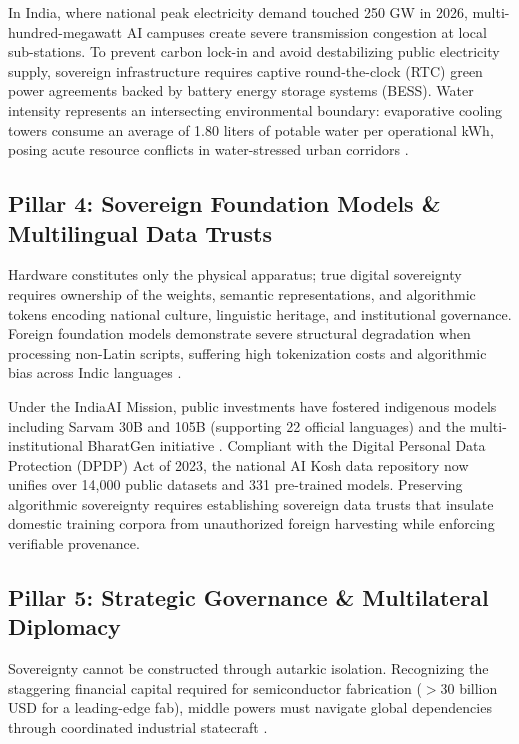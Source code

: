 \documentclass[conference,a4paper]{IEEEtran}
\begin{document}
In India, where national peak electricity demand touched 250 GW in 2026, multi-hundred-megawatt AI campuses create severe transmission congestion at local sub-stations. To prevent carbon lock-in and avoid destabilizing public electricity supply, sovereign infrastructure requires captive round-the-clock (RTC) green power agreements backed by battery energy storage systems (BESS). Water intensity represents an intersecting environmental boundary: evaporative cooling towers consume an average of 1.80 liters of potable water per operational kWh, posing acute resource conflicts in water-stressed urban corridors \cite{iea2024energy, lbnl2025energy}.

\subsection{Pillar 4: Sovereign Foundation Models \& Multilingual Data Trusts}
Hardware constitutes only the physical apparatus; true digital sovereignty requires ownership of the weights, semantic representations, and algorithmic tokens encoding national culture, linguistic heritage, and institutional governance. Foreign foundation models demonstrate severe structural degradation when processing non-Latin scripts, suffering high tokenization costs and algorithmic bias across Indic languages \cite{thakker2026sovereign}.

Under the IndiaAI Mission, public investments have fostered indigenous models including Sarvam 30B and 105B (supporting 22 official languages) and the multi-institutional BharatGen initiative \cite{meity2026semicon}. Compliant with the Digital Personal Data Protection (DPDP) Act of 2023, the national AI Kosh data repository now unifies over 14,000 public datasets and 331 pre-trained models. Preserving algorithmic sovereignty requires establishing sovereign data trusts that insulate domestic training corpora from unauthorized foreign harvesting while enforcing verifiable provenance.

\subsection{Pillar 5: Strategic Governance \& Multilateral Diplomacy}
Sovereignty cannot be constructed through autarkic isolation. Recognizing the staggering financial capital required for semiconductor fabrication ($>$30 billion USD for a leading-edge fab), middle powers must navigate global dependencies through coordinated industrial statecraft \cite{portulans2026sovereignty}.
\end{document}

